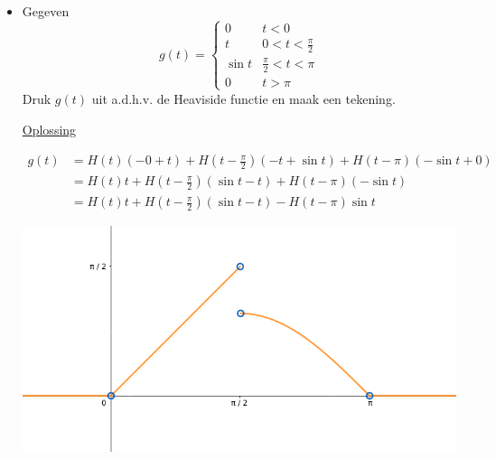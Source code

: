 \documentclass[12pt]{report}
\newcommand{\exercise}[2]{
  #1
  

  \underline{Oplossing}
  
  #2
  
  \hrulefill
}
\begin{document}
\begin{itemize}[label={}]
\item \exercise{Gegeven $$g(t) = \begin{cases}
                            0 & t < 0 \\
                            t &  0 < t < \frac{\pi}{2} \\
                            \sin t & \frac{\pi}{2} < t < \pi \\
                            0 & t > \pi         
                           \end{cases}
$$
Druk $g(t)$ uit a.d.h.v. de Heaviside functie en maak een tekening.}{
\begin{equation*}
 \begin{split}
  g(t) & = H(t)(-0 + t) + H(t - \frac{\pi}{2})(-t + \sin t) + H(t - \pi)(-\sin t + 0) \\
       & = H(t)t + H(t - \frac{\pi}{2})(\sin t - t) + H(t - \pi)(-\sin t) \\
       & = H(t)t + H(t - \frac{\pi}{2})(\sin t - t) - H(t - \pi)\sin t
 \end{split}
\end{equation*}
\begin{center}
 \includegraphics[width=\textwidth]{oef2_heaviside}
\end{center}
}


\end{itemize}
\end{document}

